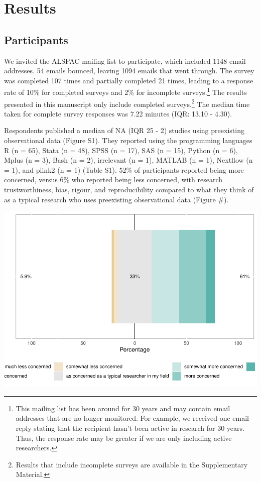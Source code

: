 \documentclass[
  man]{apa6}
\begin{document}
\hypertarget{results}{%
\section{Results}\label{results}}

\hypertarget{participants}{%
\subsection{Participants}\label{participants}}

We invited the ALSPAC mailing list to participate, which included 1148 email addresses. 54 emails bounced, leaving 1094 emails that went through. The survey was completed 107 times and partially completed 21 times, leading to a response rate of 10\% for completed surveys and 2\% for incomplete surveys.\footnote{This mailing list has been around for 30 years and may contain email addresses that are no longer monitored. For example, we received one email reply stating that the recipient hasn't been active in research for 30 years. Thus, the response rate may be greater if we are only including active researchers.} The results presented in this manuscript only include completed surveys.\footnote{Results that include incomplete surveys are available in the Supplementary Material.} The median time taken for complete survey responses was 7.22 minutes (IQR: 13.10 - 4.30).

Respondents published a median of NA (IQR 25 - 2) studies using preexisting observational data (Figure S1). They reported using the programming languages R (n = 65), Stata (n = 48), SPSS (n = 17), SAS (n = 15), Python (n = 6), Mplus (n = 3), Bash (n = 2), irrelevant (n = 1), MATLAB (n = 1), Nextflow (n = 1), and plink2 (n = 1) (Table S1). 52\% of participants reported being more concerned, versus 6\% who reported being less concerned, with research trustworthiness, bias, rigour, and reproducibility compared to what they think of as a typical research who uses preexisting observational data (Figure \#).

\includegraphics{manuscript_files/figure-latex/unnamed-chunk-3-1.pdf}
\end{document}
